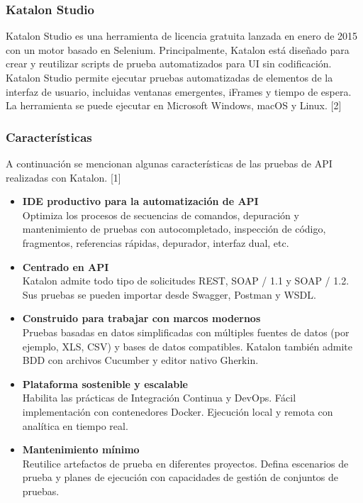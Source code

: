\documentclass[twoside,twocolumn]{article}
\begin{document}
\subsubsection{Katalon Studio}

Katalon Studio es una herramienta de licencia gratuita lanzada en enero de 2015 con un motor basado en Selenium. Principalmente, Katalon está diseñado para crear y reutilizar scripts de prueba automatizados para UI sin codificación. Katalon Studio permite ejecutar pruebas automatizadas de elementos de la interfaz de usuario, incluidas ventanas emergentes, iFrames y tiempo de espera. La herramienta se puede ejecutar en Microsoft Windows, macOS y Linux. [2]

\subsubsection{Características}

A continuación se mencionan algunas características de las pruebas de API realizadas con Katalon. [1]

\begin{itemize}
  \item \textbf{IDE productivo para la automatización de API} \\
  Optimiza los procesos de secuencias de comandos, depuración y mantenimiento de pruebas con autocompletado, inspección de código, fragmentos, referencias rápidas, depurador, interfaz dual, etc.  
  \item \textbf{Centrado en API} \\
  Katalon admite todo tipo de solicitudes REST, SOAP / 1.1 y SOAP / 1.2. Sus pruebas se pueden importar desde Swagger, Postman y WSDL.
  \item \textbf{Construido para trabajar con marcos modernos} \\
  Pruebas basadas en datos simplificadas con múltiples fuentes de datos (por ejemplo, XLS, CSV) y bases de datos compatibles. Katalon también admite BDD con archivos Cucumber y editor nativo Gherkin.
  \item \textbf{Plataforma sostenible y escalable} \\
  Habilita las prácticas de Integración Continua y DevOps. Fácil implementación con contenedores Docker. Ejecución local y remota con analítica en tiempo real.
  \item \textbf{Mantenimiento mínimo} \\
  Reutilice artefactos de prueba en diferentes proyectos. Defina escenarios de prueba y planes de ejecución con capacidades de gestión de conjuntos de pruebas.
\end{itemize}
\end{document}
